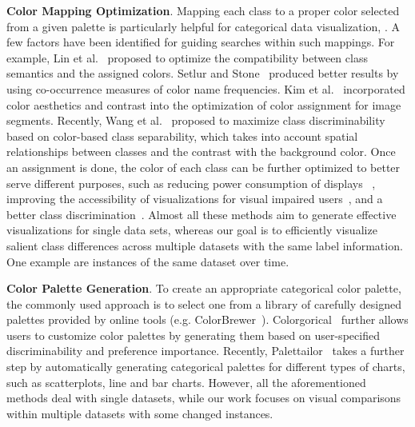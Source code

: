 \vspace{1.5mm}
\noindent\textbf{Color Mapping Optimization}. Mapping each class to a proper color selected from a given palette is particularly helpful for categorical data visualization, . %
A few %
factors have been identified for guiding searches within such mappings.
For example, Lin et al.~\cite{lin2013selecting} proposed to optimize the compatibility between class semantics and the assigned colors. Setlur and Stone~\cite{setlur2016linguistic} produced better results by using co-occurrence measures of color name frequencies.
Kim et al.~\cite{Kim14} incorporated color aesthetics and contrast into the optimization of color assignment for image segments.
Recently, Wang et al.~\cite{Wang2018} proposed to maximize class discriminability based on color-based class separability, which takes into account spatial relationships between classes and the contrast with the background color.
Once an assignment is done, the color of each class can be further optimized to better serve different purposes, such as reducing power consumption of displays~\cite{chuang2009energy} ,
improving the accessibility of visualizations for visual impaired users~\cite{machado2009physiologically}, and a better class discrimination~\cite{lee2013perceptually}.
Almost all these methods aim to generate effective visualizations for single data sets, whereas our goal is to efficiently visualize salient class differences across multiple datasets with the same label information. One example are instances of the same dataset over time.

\vspace{1.5mm}
\noindent\textbf{Color Palette Generation}.
To create an appropriate categorical color palette, the commonly used approach is to select one from a library of carefully designed palettes provided by online tools (e.g. ColorBrewer~\cite{harrower2003colorbrewer}).
Colorgorical~\cite{Gramazio17} further allows users to customize color palettes by generating them based on user-specified discriminability and preference importance.
Recently, Palettailor~\cite{Lu21} takes a further step by automatically generating categorical palettes for different types of charts, such as scatterplots, line and bar charts.
However, all the aforementioned methods deal with single datasets, while our work focuses on visual comparisons within multiple
datasets with some changed instances.

